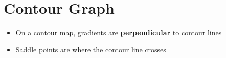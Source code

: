 \section{Contour Graph}

  \begin{itemize}
    \item On a contour map, gradients
    \ul{are \textbf{perpendicular} to contour lines}
    \item Saddle points are where the contour line crosses
  \end{itemize}
